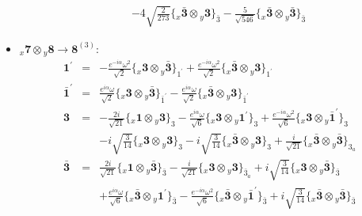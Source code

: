 \documentclass[english]{article}
\newcommand{\rep}[1]{\mathbf{#1}}
\newcommand{\repx}[2]{{}_{#2}\mathbf{#1}}
\newcommand{\subcg}[3]{\big\{ \repx{#1}{x}\otimes\repx{#2}{y}\big\}^{}_{#3}}
\begin{document}
\begin{itemize}
\begin{eqnarray*}
 & & -4 \sqrt{\frac{2}{273}}\subcg{\bar{3}}{3}{\bar{3}}-\frac{5}{\sqrt{546}}\subcg{\bar{3}}{\bar{3}}{\bar{3}}
\end{eqnarray*}
\item $\repx{7}{x}\otimes\repx{8}{y}\to\rep{8}^{(3)}$:
\begin{eqnarray*}
\rep{1^{\prime}} &=& -\frac{e^{-i \alpha } \omega ^2}{\sqrt{2}}\subcg{3}{\bar{3}}{1^{\prime}}+\frac{e^{-i \alpha } \omega ^2}{\sqrt{2}}\subcg{\bar{3}}{3}{1^{\prime}}
\\
\rep{\bar{1}^{\prime}} &=& \frac{e^{i \alpha } \omega }{\sqrt{2}}\subcg{3}{\bar{3}}{\bar{1}^{\prime}}-\frac{e^{i \alpha } \omega }{\sqrt{2}}\subcg{\bar{3}}{3}{\bar{1}^{\prime}}
\\
\rep{3} &=& -\frac{2 i}{\sqrt{21}}\subcg{1}{3}{3}-\frac{e^{i \alpha } \omega }{\sqrt{6}}\subcg{3}{1^{\prime}}{3}+\frac{e^{-i \alpha } \omega ^2}{\sqrt{6}}\subcg{3}{\bar{1}^{\prime}}{3} \\ 
 & & -i \sqrt{\frac{3}{14}}\subcg{3}{3}{3}-i \sqrt{\frac{3}{14}}\subcg{\bar{3}}{3}{3}+\frac{i}{\sqrt{21}}\subcg{\bar{3}}{\bar{3}}{3_{a}}
\\
\rep{\bar{3}} &=& \frac{2 i}{\sqrt{21}}\subcg{1}{\bar{3}}{\bar{3}}-\frac{i}{\sqrt{21}}\subcg{3}{3}{\bar{3}_{a}}+i \sqrt{\frac{3}{14}}\subcg{3}{\bar{3}}{\bar{3}} \\ 
 & & +\frac{e^{i \alpha } \omega }{\sqrt{6}}\subcg{\bar{3}}{1^{\prime}}{\bar{3}}-\frac{e^{-i \alpha } \omega ^2}{\sqrt{6}}\subcg{\bar{3}}{\bar{1}^{\prime}}{\bar{3}}+i \sqrt{\frac{3}{14}}\subcg{\bar{3}}{\bar{3}}{\bar{3}}
\end{eqnarray*}
\end{itemize}
\end{document}
